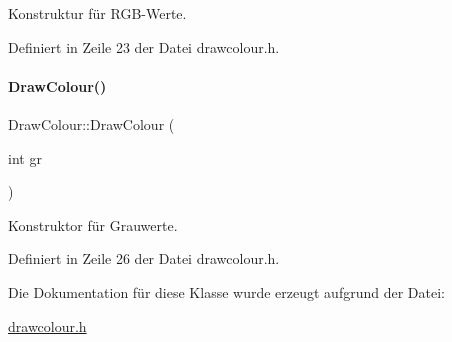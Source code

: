 Konstruktur für R\+G\+B-\/\+Werte. 



Definiert in Zeile 23 der Datei drawcolour.\+h.

\mbox{\label{classDrawColour_a723a3d63cba2d7cb7438e9080233b3fd}} 
\paragraph{\texorpdfstring{Draw\+Colour()}{DrawColour()}\hspace{0.1cm}{\footnotesize\ttfamily [4/4]}}
{\footnotesize\ttfamily Draw\+Colour\+::\+Draw\+Colour (\begin{DoxyParamCaption}\item[{int}]{gr }\end{DoxyParamCaption})\hspace{0.3cm}{\ttfamily [inline]}}



Konstruktor für Grauwerte. 



Definiert in Zeile 26 der Datei drawcolour.\+h.



Die Dokumentation für diese Klasse wurde erzeugt aufgrund der Datei\+:\begin{DoxyCompactItemize}
\item 
\mbox{\hyperlink{drawcolour_8h}{drawcolour.\+h}}\end{DoxyCompactItemize}
